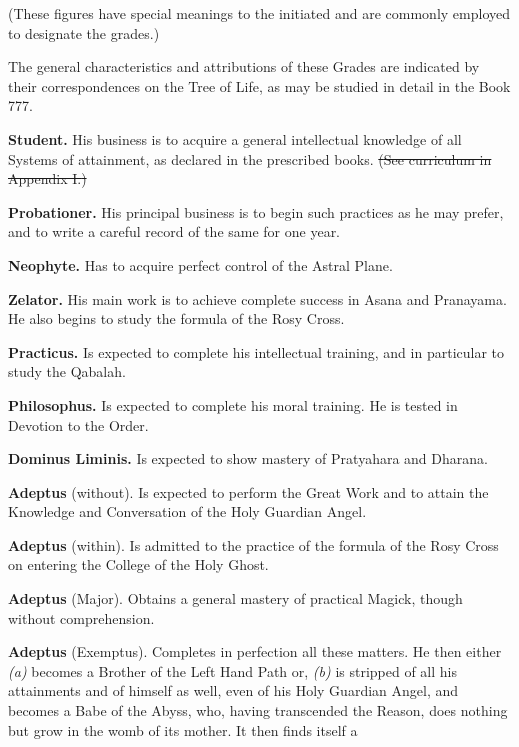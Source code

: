(These figures have special meanings to the initiated and are commonly employed to designate the grades.)

The general characteristics and attributions of these Grades are indicated by their correspondences on the Tree of Life, as may be studied in detail in the Book 777.

\textbf{Student.} \textemdash{} His business is to acquire a general intellectual knowledge of all Systems of attainment, as declared in the prescribed books. \sout{(\sout{See curriculum in Appendix I.})}

\textbf{Probationer.} \textemdash{} His principal business is to begin such practices as he may prefer, and to write a careful record of the same for one year.

\textbf{Neophyte.} \textemdash{} Has to acquire perfect control of the Astral Plane.

\textbf{Zelator.} \textemdash{} His main work is to achieve complete success in Asana and Pranayama. He also begins to study the formula of the Rosy Cross.

\textbf{Practicus.} \textemdash{} Is expected to complete his intellectual training, and in particular to study the Qabalah.

\textbf{Philosophus.} \textemdash{} Is expected to complete his moral training. He is tested in Devotion to the Order.

\textbf{Dominus Liminis.} \textemdash{} Is expected to show mastery of Pratyahara and Dharana.

\textbf{Adeptus} (without). \textemdash{} Is expected to perform the Great Work and to attain the Knowledge and Conversation of the Holy Guardian Angel.

\textbf{Adeptus} (within). \textemdash{} Is admitted to the practice of the formula of the Rosy Cross on entering the College of the Holy Ghost.

\textbf{Adeptus} (Major). \textemdash{} Obtains a general mastery of practical Magick, though without comprehension.

\textbf{Adeptus} (Exemptus). \textemdash{} Completes in perfection all these matters. He then either \textit{(a)} becomes a Brother of the Left Hand Path or, \textit{(b)}  is stripped of all his attainments and of himself as well, even of his Holy Guardian Angel, and becomes a Babe of the Abyss, who, having transcended the Reason, does nothing but grow in the womb of its mother. It then finds itself a

